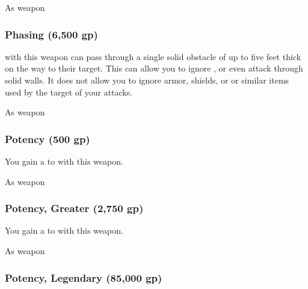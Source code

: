  


 As weapon


\lowercase{\hypertarget{item:Phasing}{}}\label{item:Phasing}
\hypertarget{item:Phasing}{\subsubsection{Phasing\hfill{} (6,500 gp)}}

 with this weapon can pass through a single solid obstacle of up to five feet thick on the way to their target.
This can allow you to ignore , or even attack through solid walls.
It does not allow you to ignore armor, shields, or or similar items used by the target of your attacks.



 


 As weapon


\lowercase{\hypertarget{item:Potency}{}}\label{item:Potency}
\hypertarget{item:Potency}{\subsubsection{Potency\hfill{} (500 gp)}}

You gain a   to  with this weapon.



 As weapon


\lowercase{\hypertarget{item:Potency, Greater}{}}\label{item:Potency, Greater}
\hypertarget{item:Potency, Greater}{\subsubsection{Potency, Greater\hfill{} (2,750 gp)}}

You gain a   to  with this weapon.



 As weapon


\lowercase{\hypertarget{item:Potency, Legendary}{}}\label{item:Potency, Legendary}
\hypertarget{item:Potency, Legendary}{\subsubsection{Potency, Legendary\hfill{} (85,000 gp)}}

